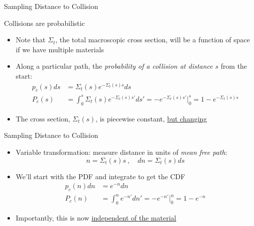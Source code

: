 \documentclass[xcolor=x11names,compress,handout]{beamer}
\renewcommand{\(}{\begin{columns}}
\renewcommand{\)}{\end{columns}}
\newcommand{\<}[1]{\begin{column}{#1}}
\renewcommand{\>}{\end{column}}
\begin{document}
\begin{frame}{Sampling Distance to Collision}

Collisions are probabilistic
\begin{itemize}
  \item Note that $\Sigma_t$, the total macroscopic cross section, will be a function of space if we have multiple materials
  \item Along a particular path, the \textit{probability of a collision at distance $s$} from the start:
    \begin{align*}
    p_c(s)ds &= \Sigma_t(s) e^{-\Sigma_t(s) s} ds \\
    P_c(s) &= \int_0^s \Sigma_t(s) e^{-\Sigma_t(s) s'}ds' = -e^{-\Sigma_t(s) s'} |_0^s = 1 - e^{-\Sigma_t(s) s}
  \end{align*}
  \item The cross section, $\Sigma_t(s)$, is piecewise constant, \underline{but changing}
\end{itemize}

\end{frame}


\begin{frame}{Sampling Distance to Collision}

\begin{itemize}
  \item Variable transformation: measure distance in units of \textit{mean free path}:
  \[n = \Sigma_t(s)s\:,\quad dn = \Sigma_t(s)ds\]
  \item We'll start with the PDF and integrate to get the CDF
 \begin{align*}
    p_c(n)dn &= e^{-n} dn\\
    P_c(n) &= \int_0^n e^{-n'}dn' = -e^{-n'} |_0^n = 1 - e^{-n}
  \end{align*}
  \item Importantly, this is now \underline{independent of the material}
\end{itemize} 

\end{frame}
\end{document}

